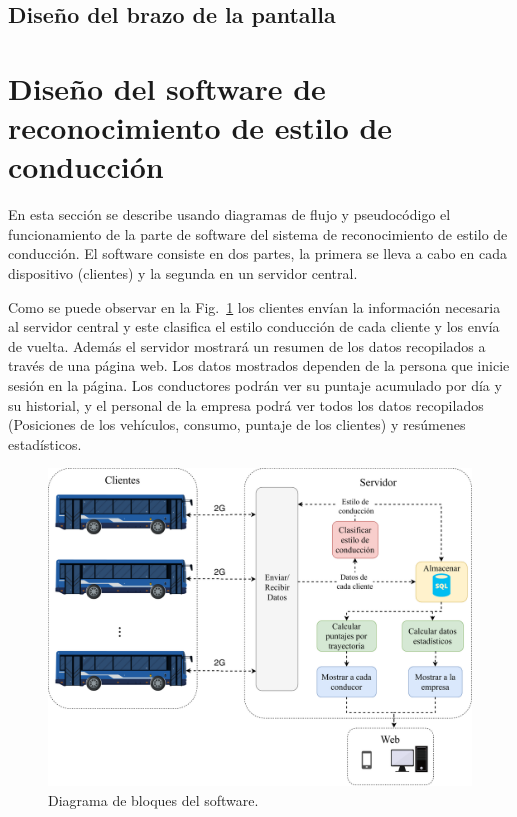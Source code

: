 \subsection{Diseño del brazo de la pantalla}




\newpage

\section{Diseño del software de reconocimiento de estilo de conducción}

En esta sección se describe usando diagramas de flujo y pseudocódigo el funcionamiento de la parte de software del sistema de reconocimiento de estilo de conducción. El software consiste en dos partes, la primera se lleva a cabo en cada dispositivo (clientes) y la segunda en un servidor central.

Como se puede observar en la Fig.~\ref{fig:Bloques_software} los clientes envían la información necesaria al servidor central y este clasifica el estilo conducción de cada cliente y los envía de vuelta. Además el servidor mostrará un resumen de los datos recopilados a través de una página web. Los datos mostrados dependen de la persona que inicie sesión en la página. Los conductores podrán ver su puntaje acumulado por día y su historial, y el personal de la empresa podrá ver todos los datos recopilados (Posiciones de los vehículos, consumo, puntaje de los clientes) y resúmenes estadísticos.

\begin{figure}[hbtp!]
\centering
\includegraphics[width=\textwidth]{Bloques_software.pdf}
\caption{Diagrama de bloques del software.}
\label{fig:Bloques_software}
\end{figure}

